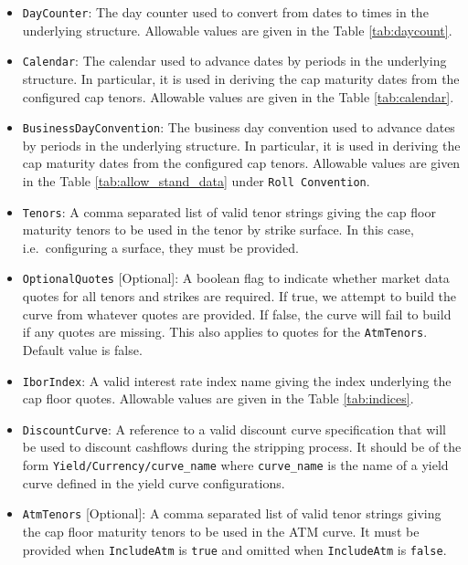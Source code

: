 \begin{itemize}
\item \lstinline!DayCounter!:
The day counter used to convert from dates to times in the underlying structure. Allowable values are given in the Table \ref{tab:daycount}.

\item \lstinline!Calendar!:
The calendar used to advance dates by periods in the underlying structure. In particular, it is used in deriving the cap maturity dates from the configured cap tenors. Allowable values are given in the Table \ref{tab:calendar}.

\item \lstinline!BusinessDayConvention!:
The business day convention used to advance dates by periods in the underlying structure. In particular, it is used in deriving the cap maturity dates from the configured cap tenors. Allowable values are given in the Table \ref{tab:allow_stand_data} under \lstinline!Roll Convention!.

\item \lstinline!Tenors!:
A comma separated list of valid tenor strings giving the cap floor maturity tenors to be used in the tenor by strike surface. In this case, i.e.\ configuring a surface, they must be provided.

\item \lstinline!OptionalQuotes! [Optional]:
A boolean flag to indicate whether market data quotes for all tenors and strikes are required. If true, we attempt to build the curve from whatever quotes are provided. If false, the curve will fail to build if any quotes are missing. This also applies to quotes for the \lstinline!AtmTenors!. Default value is false.

\item \lstinline!IborIndex!:
A valid interest rate index name giving the index underlying the cap floor quotes. Allowable values are given in the Table \ref{tab:indices}.

\item \lstinline!DiscountCurve!:
A reference to a valid discount curve specification that will be used to discount cashflows during the stripping process. It should be of the form \lstinline!Yield/Currency/curve_name! where \lstinline!curve_name! is the name of a yield curve defined in the yield curve configurations.

\item \lstinline!AtmTenors! [Optional]:
A comma separated list of valid tenor strings giving the cap floor maturity tenors to be used in the ATM curve. It must be provided when \lstinline!IncludeAtm! is \lstinline!true! and omitted when \lstinline!IncludeAtm! is \lstinline!false!.


\end{itemize}

